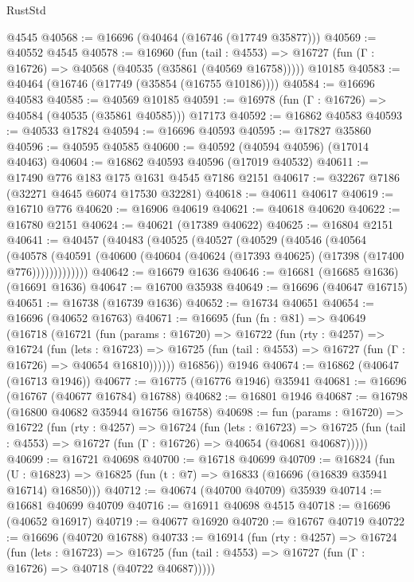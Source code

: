 \begin{lexlean}{RustStd}
\begin{coremodule}
    @4545
@40568 := @16696 (@40464 (@16746 (@17749 @35877)))
@40569 := @40552 @4545
@40578 := @16960
    (fun (tail : @4553) => @16727 (fun (Γ : @16726) => @40568 (@40535 (@35861 (@40569 @16758)))))
    @10185
@40583 := @40464 (@16746 (@17749 (@35854 (@16755 @10186))))
@40584 := @16696 @40583
@40585 := @40569 @10185
@40591 := @16978 (fun (Γ : @16726) => @40584 (@40535 (@35861 @40585))) @17173
@40592 := @16862 @40583
@40593 := @40533 @17824
@40594 := @16696 @40593
@40595 := @17827 @35860
@40596 := @40595 @40585
@40600 := @40592 (@40594 @40596) (@17014 @40463)
@40604 := @16862 @40593 @40596 (@17019 @40532)
@40611 := @17490 @776 @183 @175 @1631 @4545 @7186 @2151
@40617 := @32267 @7186 (@32271 @4645 @6074 @17530 @32281)
@40618 := @40611 @40617
@40619 := @16710 @776
@40620 := @16906 @40619
@40621 := @40618 @40620
@40622 := @16780 @2151
@40624 := @40621 (@17389 @40622)
@40625 := @16804 @2151
@40641 := @40457
    (@40483
      (@40525
        (@40527
          (@40529
            (@40546
              (@40564
                (@40578
                  (@40591 (@40600 (@40604 (@40624 (@17393 @40625) (@17398 (@17400 @776)))))))))))))
@40642 := @16679 @1636
@40646 := @16681 (@16685 @1636) (@16691 @1636)
@40647 := @16700 @35938
@40649 := @16696 (@40647 @16715)
@40651 := @16738 (@16739 @1636)
@40652 := @16734 @40651
@40654 := @16696 (@40652 @16763)
@40671 := @16695
    (fun (fn : @81) =>
    @40649
      (@16718
        (@16721
          (fun (params : @16720) =>
          @16722
            (fun (rty : @4257) =>
            @16724
              (fun (lets : @16723) =>
              @16725 (fun (tail : @4553) => @16727 (fun (Γ : @16726) => @40654 @16810))))))
        @16856))
    @1946
@40674 := @16862 (@40647 (@16713 @1946))
@40677 := @16775 (@16776 @1946) @35941
@40681 := @16696 (@16767 (@40677 @16784) @16788)
@40682 := @16801 @1946
@40687 := @16798 (@16800 @40682 @35944 @16756 @16758)
@40698 := fun (params : @16720) =>
  @16722
    (fun (rty : @4257) =>
    @16724
      (fun (lets : @16723) =>
      @16725 (fun (tail : @4553) => @16727 (fun (Γ : @16726) => @40654 (@40681 @40687)))))
@40699 := @16721 @40698
@40700 := @16718 @40699
@40709 := @16824
    (fun (U : @16823) => @16825 (fun (t : @7) => @16833 (@16696 (@16839 @35941 @16714) @16850)))
@40712 := @40674 (@40700 @40709) @35939
@40714 := @16681 @40699 @40709
@40716 := @16911 @40698 @4515
@40718 := @16696 (@40652 @16917)
@40719 := @40677 @16920
@40720 := @16767 @40719
@40722 := @16696 (@40720 @16788)
@40733 := @16914
    (fun (rty : @4257) =>
    @16724
      (fun (lets : @16723) =>
      @16725 (fun (tail : @4553) => @16727 (fun (Γ : @16726) => @40718 (@40722 @40687)))))

\end{coremodule}
\end{lexlean}
